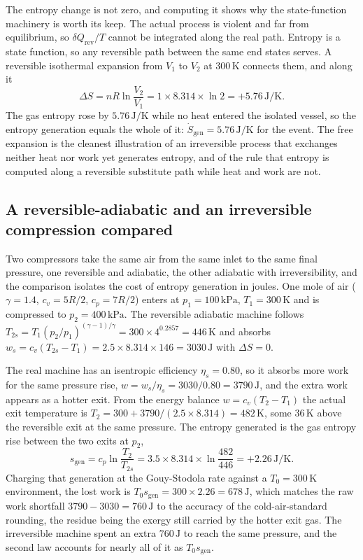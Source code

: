 The entropy change is not zero, and computing it shows why the state-function
machinery is worth its keep. The actual process is violent and far from
equilibrium, so $\delta Q_{\text{rev}}/T$ cannot be integrated along the real
path. Entropy is a state function, so any reversible path between the same end
states serves. A reversible isothermal expansion from $V_1$ to $V_2$ at
$300\,\si{\kelvin}$ connects them, and along it
\[
\Delta S = nR\ln\frac{V_2}{V_1} = 1 \times 8.314 \times \ln 2 =
+5.76\,\text{J}/\si{\kelvin}.
\]
The gas entropy rose by $5.76\,\text{J}/\si{\kelvin}$ while no heat entered
the isolated vessel, so the entropy generation equals the whole of it:
$\dot S_{\text{gen}} = 5.76\,\text{J}/\si{\kelvin}$ for the event. The free
expansion is the cleanest illustration of an irreversible process that
exchanges neither heat nor work yet generates entropy, and of the rule that
entropy is computed along a reversible substitute path while heat and work
are not.

\subsection{A reversible-adiabatic and an irreversible compression compared}

Two compressors take the same air from the same inlet to the same final
pressure, one reversible and adiabatic, the other adiabatic with
irreversibility, and the comparison isolates the cost of entropy generation
in joules. One mole of air ($\gamma = 1.4$, $c_v = 5R/2$, $c_p = 7R/2$) enters
at $p_1 = 100\,\text{kPa}$, $T_1 = 300\,\si{\kelvin}$ and is compressed to
$p_2 = 400\,\text{kPa}$. The reversible adiabatic machine follows
$T_{2s} = T_1 (p_2/p_1)^{(\gamma-1)/\gamma} = 300 \times 4^{0.2857} =
446\,\si{\kelvin}$ and absorbs $w_s = c_v(T_{2s} - T_1) = 2.5 \times 8.314
\times 146 = 3030\,\text{J}$ with $\Delta S = 0$.

The real machine has an isentropic efficiency $\eta_s = 0.80$, so it absorbs
more work for the same pressure rise, $w = w_s/\eta_s = 3030/0.80 =
3790\,\text{J}$, and the extra work appears as a hotter exit. From the energy
balance $w = c_v(T_2 - T_1)$ the actual exit temperature is $T_2 = 300 +
3790/(2.5 \times 8.314) = 482\,\si{\kelvin}$, some $36\,\si{\kelvin}$ above
the reversible exit at the same pressure. The entropy generated is the gas
entropy rise between the two exits at $p_2$,
\[
s_{\text{gen}} = c_p\ln\frac{T_2}{T_{2s}} = 3.5 \times 8.314 \times
\ln\frac{482}{446} = +2.26\,\text{J}/\si{\kelvin}.
\]
Charging that generation at the Gouy-Stodola rate against a
$T_0 = 300\,\si{\kelvin}$ environment, the lost work is $T_0 s_{\text{gen}} =
300 \times 2.26 = 678\,\text{J}$, which matches the raw work shortfall
$3790 - 3030 = 760\,\text{J}$ to the accuracy of the cold-air-standard
rounding, the residue being the exergy still carried by the hotter exit gas.
The irreversible machine spent an extra $760\,\text{J}$ to reach the same
pressure, and the second law accounts for nearly all of it as
$T_0 s_{\text{gen}}$.

